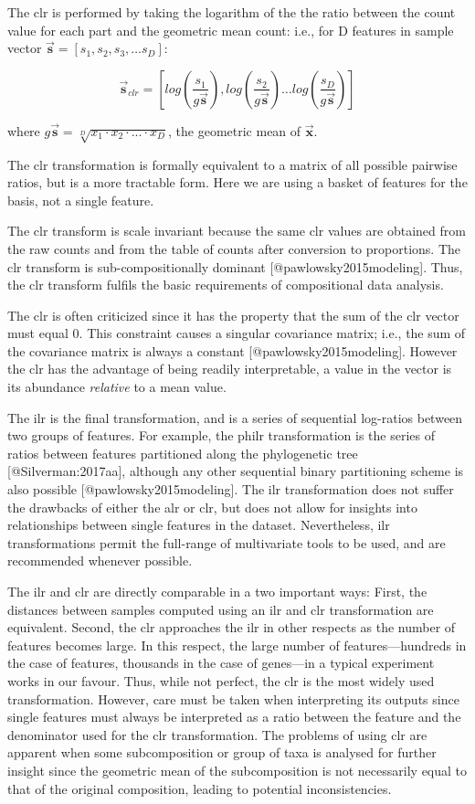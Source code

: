 \documentclass[
  onecolumn]{article}
\newcommand{\vect}[1]{\vec{\textbf{#1}}}
\begin{document}
The clr is performed by taking the logarithm of the the ratio between the count value for each part and the geometric mean count: i.e., for D features in sample vector \(\vect{s} = [s_1, s_2, s_3, \ldots s_D]\):

\begin{equation}
 \vect{s}_{clr}  = [log(\frac{s_1}{g\vect{s}}), log(\frac{s_2}{g\vect{s}}) \ldots log(\frac{s_D}{g\vect{s}})]
\end{equation}

where \(g\vect{s} = \sqrt[D]{x_1 \cdot x_2 \cdot ... \cdot x_D}\), the geometric mean of \(\vec{\textbf{x}}\).

The clr transformation is formally equivalent to a matrix of all possible pairwise ratios, but is a more tractable form. Here we are using a basket of features for the basis, not a single feature.

The clr transform is scale invariant because the same clr values are obtained from the raw counts and from the table of counts after conversion to proportions. The clr transform is sub-compositionally dominant {[}@pawlowsky2015modeling{]}. Thus, the clr transform fulfils the basic requirements of compositional data analysis.

The clr is often criticized since it has the property that the sum of the clr vector must equal 0. This constraint causes a singular covariance matrix; i.e., the sum of the covariance matrix is always a constant {[}@pawlowsky2015modeling{]}. However the clr has the advantage of being readily interpretable, a value in the vector is its abundance \emph{relative} to a mean value.

The ilr is the final transformation, and is a series of sequential log-ratios between two groups of features. For example, the philr transformation is the series of ratios between features partitioned along the phylogenetic tree {[}@Silverman:2017aa{]}, although any other sequential binary partitioning scheme is also possible {[}@pawlowsky2015modeling{]}. The ilr transformation does not suffer the drawbacks of either the alr or clr, but does not allow for insights into relationships between single features in the dataset. Nevertheless, ilr transformations permit the full-range of multivariate tools to be used, and are recommended whenever possible.

The ilr and clr are directly comparable in a two important ways: First, the distances between samples computed using an ilr and clr transformation are equivalent. Second, the clr approaches the ilr in other respects as the number of features becomes large. In this respect, the large number of features---hundreds in the case of features, thousands in the case of genes---in a typical experiment works in our favour. Thus, while not perfect, the clr is the most widely used transformation. However, care must be taken when interpreting its outputs since single features must always be interpreted as a ratio between the feature and the denominator used for the clr transformation. The problems of using clr are apparent when some subcomposition or group of taxa is analysed for further insight since the geometric mean of the subcomposition is not necessarily equal to that of the original composition, leading to potential inconsistencies.
\end{document}
